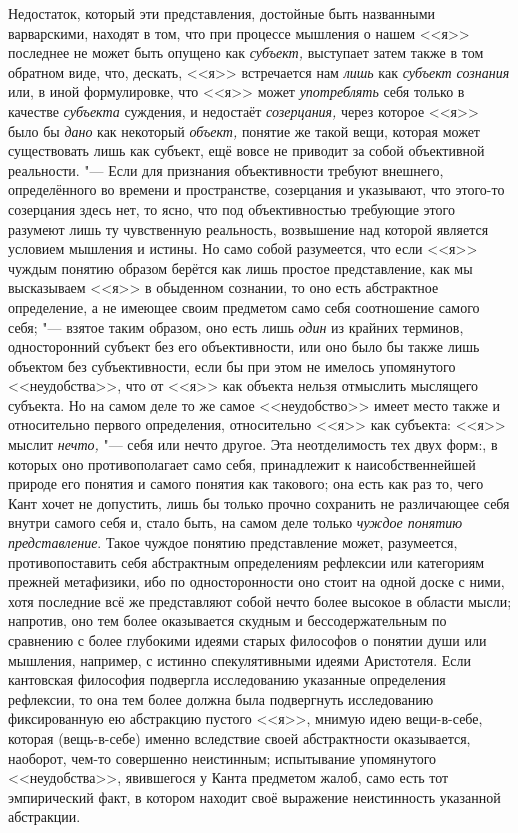 Недостаток, который эти представления, достойные быть
названными варварскими, находят в том, что при процессе мышления о нашем
<<я>> последнее не может быть опущено как
{\em субъект,} выступает
затем также в том обратном виде, что, дескать, <<я>> встречается нам
{\em лишь} как
{\em субъект сознания}
или, в иной формулировке, что <<я>> может
{\em употреблять} себя
только в качестве {\em субъекта}
суждения, и недостаёт
{\em созерцания,} через
которое <<я>> было бы {\em дано}
как некоторый
{\em объект,} понятие же
такой вещи, которая может существовать лишь как субъект, ещё вовсе не
приводит за собой объективной
реальности\label{bkm:bm98}.
"--- Если для признания объективности требуют внешнего,
определённого во времени и пространстве, созерцания и указывают, что
этого-то созерцания здесь нет, то ясно, что под объективностью требующие
этого разумеют лишь ту чувственную реальность, возвышение над которой
является условием мышления и истины. Но само собой разумеется, что если <<я>>
чуждым понятию образом берётся как лишь простое представление, как мы
высказываем <<я>> в обыденном сознании, то оно есть абстрактное определение,
а не имеющее своим предметом само себя соотношение самого
себя; "--- взятое таким образом, оно есть лишь
{\em один} из крайних
терминов, односторонний субъект без его объективности, или оно было бы
также лишь объектом без субъективности, если бы при этом не имелось
упомянутого <<неудобства>>, что от <<я>> как объекта нельзя отмыслить мыслящего
субъекта. Но на самом деле то же самое <<неудобство>> имеет место также и
относительно первого определения, относительно <<я>> как субъекта: <<я>> мыслит
{\em нечто,} "--- себя или
нечто другое. Эта неотделимость тех двух форм:, в которых оно
противополагает само себя, принадлежит к наисобственнейшей природе его
понятия и самого понятия как такового; она есть как раз то, чего Кант хочет
не допустить, лишь бы только прочно сохранить не различающее
себя внутри самого себя и, стало быть, на самом деле только
{\em чуждое понятию представление}.
Такое чуждое понятию представление может, разумеется,
противопоставить себя абстрактным определениям рефлексии или категориям
прежней метафизики, ибо по односторонности оно стоит на одной доске с ними,
хотя последние всё же представляют собой нечто более высокое в области
мысли; напротив, оно тем более оказывается скудным и бессодержательным по
сравнению с более глубокими идеями старых философов о понятии души или
мышления, например, с истинно спекулятивными идеями Аристотеля. Если
кантовская философия подвергла исследованию указанные определения
рефлексии, то она тем более должна была подвергнуть исследованию
фиксированную ею абстракцию пустого <<я>>, мнимую идею вещи-в-себе, которая
(вещь-в-себе) именно вследствие своей абстрактности оказывается, наоборот,
чем-то совершенно неистинным; испытывание упомянутого <<неудобства>>,
явившегося у Канта предметом жалоб, само есть тот эмпирический факт, в
котором находит своё выражение неистинность указанной абстракции.

